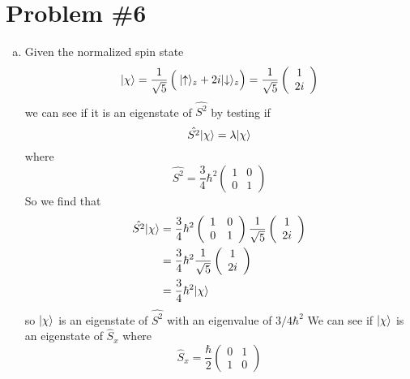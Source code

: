 \documentclass[11pt]{article}
\numberwithin{equation}{section}
\begin{document}
\section{Problem \#6}
\begin{enumerate}[(a)]
\item
Given the normalized spin state 
$$|{\chi}\rangle = \frac{1}{\sqrt{5}}\left(\frac{}{}|{\uparrow}\rangle_z+2i|{\downarrow}\rangle_z\right) = \frac{1}{\sqrt{5}}\left(\begin{array}{c}1\\ 2i\end{array}\right)$$
we can see if it is an eigenstate of $\hat{S^2}$ by testing if
$$\hat{S^2}|{\chi}\rangle = \lambda|{\chi}\rangle$$
where
$$\hat{S^2} = \frac{3}{4}\hbar^2\left(\begin{array}{cc}
                                       1   &0\\                         
                                       0   &1                         
                                      \end{array}\right)$$
So we find that
\begin{align*}
\hat{S^2}|{\chi}\rangle &= \frac{3}{4}\hbar^2\left(\begin{array}{cc}
                                       1   &0\\                         
                                       0   &1                         
                                      \end{array}\right)
\frac{1}{\sqrt{5}}\left(\begin{array}{c}1\\ 2i\end{array}\right)\\
&= \frac{3}{4}\hbar^2\frac{1}{\sqrt{5}}\left(\begin{array}{c}1\\ 2i\end{array}\right)\\
&= \frac{3}{4}\hbar^2|{\chi}\rangle
\end{align*}
so $|{\chi}\rangle$ is an eigenstate of $\hat{S^2}$ with an eigenvalue of $3/4\hbar^2$
We can see if $|{\chi}\rangle$ is an eigenstate of $\hat{S}_x$ where
$$\hat{S}_x = \frac{\hbar}{2}\left(\begin{array}{cc}
                                       0   &1\\                        
                                       1   &0                         
                                      \end{array}\right)$$

\end{enumerate}
\end{document}
